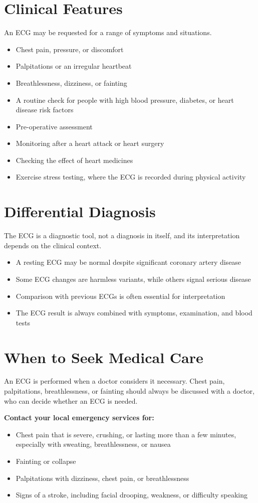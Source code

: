 \section*{Clinical Features}
An ECG may be requested for a range of symptoms and situations.
\begin{itemize}
    \item Chest pain, pressure, or discomfort
    \item Palpitations or an irregular heartbeat
    \item Breathlessness, dizziness, or fainting
    \item A routine check for people with high blood pressure, diabetes, or heart disease risk factors
    \item Pre-operative assessment
    \item Monitoring after a heart attack or heart surgery
    \item Checking the effect of heart medicines
    \item Exercise stress testing, where the ECG is recorded during physical activity
\end{itemize}

\section*{Differential Diagnosis}
The ECG is a diagnostic tool, not a diagnosis in itself, and its interpretation depends on the clinical context.
\begin{itemize}
    \item A resting ECG may be normal despite significant coronary artery disease
    \item Some ECG changes are harmless variants, while others signal serious disease
    \item Comparison with previous ECGs is often essential for interpretation
    \item The ECG result is always combined with symptoms, examination, and blood tests
\end{itemize}

\section*{When to Seek Medical Care}
An ECG is performed when a doctor considers it necessary. Chest pain, palpitations, breathlessness, or fainting should always be discussed with a doctor, who can decide whether an ECG is needed.

\textbf{Contact your local emergency services for:}
\begin{itemize}
    \item Chest pain that is severe, crushing, or lasting more than a few minutes, especially with sweating, breathlessness, or nausea
    \item Fainting or collapse
    \item Palpitations with dizziness, chest pain, or breathlessness
    \item Signs of a stroke, including facial drooping, weakness, or difficulty speaking
\end{itemize}

